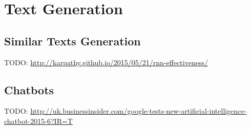 
\section{Text Generation}%
\label{sec:text-generation}%

\subsection{Similar Texts Generation}
TODO: \href{http://karpathy.github.io/2015/05/21/rnn-effectiveness/}{http://karpathy.github.io/2015/05/21/rnn-effectiveness/}

\subsection{Chatbots}%
\label{subsec:chatbots}%

TODO: \href{http://uk.businessinsider.com/google-tests-new-artificial-intelligence-chatbot-2015-6?IR=T}{http://uk.businessinsider.com/google-tests-new-artificial-intelligence-chatbot-2015-6?IR=T}
